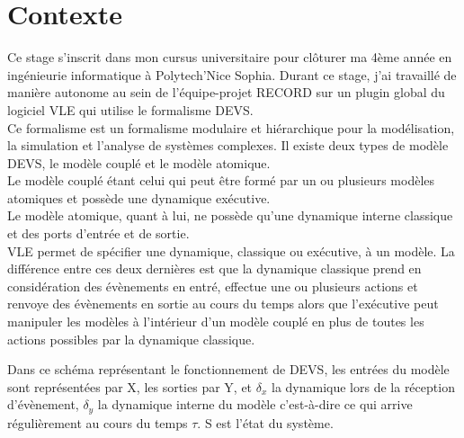 \section{Contexte}
Ce stage s'inscrit dans mon cursus universitaire pour clôturer ma 4ème année en ingénieurie informatique à Polytech'Nice Sophia.
Durant ce stage, j'ai travaillé de manière autonome au sein de l'équipe-projet RECORD sur un plugin global du logiciel VLE qui utilise le formalisme DEVS.\\
Ce formalisme est un formalisme modulaire et hiérarchique pour la modélisation, la simulation et l'analyse de systèmes complexes. Il existe deux types de modèle DEVS, le modèle couplé et le modèle atomique. \\
Le modèle couplé étant celui qui peut être formé par un ou plusieurs modèles atomiques et possède une dynamique exécutive.\\
Le modèle atomique, quant à lui, ne possède qu'une dynamique interne classique et des ports d'entrée et de sortie.\\
VLE permet de spécifier une dynamique, classique ou exécutive, à un modèle. La différence entre ces deux dernières est que la dynamique classique prend en considération des évènements en entré, effectue une ou plusieurs actions et renvoye des évènements en sortie au cours du temps alors que l'exécutive peut manipuler les modèles à l'intérieur d'un modèle couplé en plus de toutes les actions possibles par la dynamique classique.\\

\begin{minipage}{\linewidth}%
\end{minipage}

Dans ce schéma représentant le fonctionnement de DEVS, les entrées du modèle sont représentées par X, les sorties par Y, et $\delta_{x}$ la dynamique lors de la réception d'évènement, $\delta_{y}$ la dynamique interne du modèle c'est-à-dire ce qui arrive régulièrement au cours du temps $\tau$. S est l'état du système.
